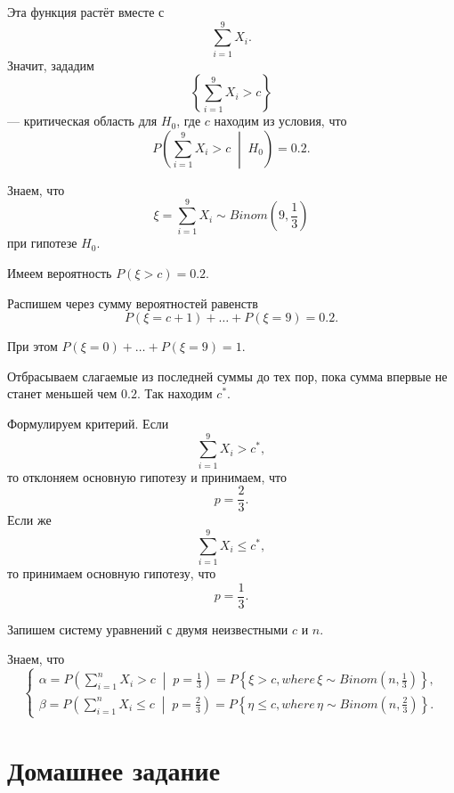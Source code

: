 Эта функция растёт вместе с
$$ \sum \limits_{i = 1}^9 X_i.$$
Значит, зададим
$$ \left\{ \sum \limits_{i = 1}^9 X_i > c \right\} $$
--- критическая область для $H_0$, где $c$ находим из условия, что
$$P \left( \sum \limits_{i = 1}^9 X_i > c \; \middle| \; H_0 \right) =
  0.2.$$

Знаем, что
$$ \xi =
  \sum \limits_{i = 1}^9 X_i \sim
  Binom \left( 9, \frac{1}{3} \right) $$
при гипотезе $H_0$.

Имеем вероятность $P \left( \xi > c \right) = 0.2$.

Распишем через сумму вероятностей равенств
$$P \left( \xi = c + 1 \right) + \dotsc + P \left( \xi = 9 \right) =
  0.2.$$

При этом $P \left( \xi = 0 \right) + \dotsc + P \left( \xi = 9 \right) = 1$.

Отбрасываем слагаемые из последней суммы до тех пор, пока сумма впервые не станет меньшей чем $0.2$.
Так находим $c^*$.

Формулируем критерий.
Если
$$ \sum \limits_{i = 1}^9 X_i >
  c^*,$$
то отклоняем основную гипотезу и принимаем, что
$$p =
  \frac{2}{3}.$$
Если же
$$ \sum \limits_{i = 1}^9 X_i \leq
  c^*,$$
то принимаем основную гипотезу, что
$$p =
  \frac{1}{3}.$$

Запишем систему уравнений с двумя неизвестными $c$ и $n$.

Знаем, что
$$ \begin{cases}
    \alpha =
      P \left( \sum \limits_{i = 1}^n X_i > c \; \middle| \; p = \frac{1}{3} \right) =
      P \left\{ \xi > c, where \, \xi \sim Binom \left( n, \frac{1}{3} \right) \right\}, \\
    \beta =
      P \left( \sum \limits_{i = 1}^n X_i \leq c \; \middle| \; p = \frac{2}{3} \right) =
      P \left\{ \eta \leq c, where \, \eta \sim Binom \left( n, \frac{2}{3} \right) \right\}.
  \end{cases}$$

\section*{Домашнее задание}
